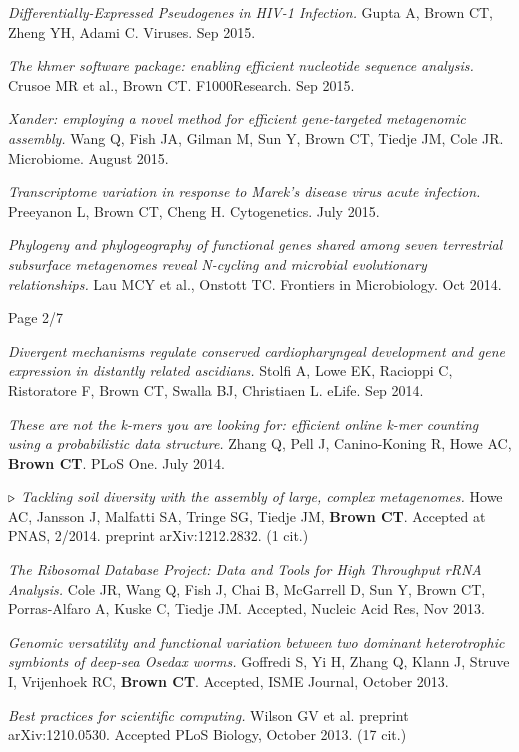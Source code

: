 \documentclass[margin,line]{resume}
\begin{document}
\begin{resume}
{\em Differentially-Expressed Pseudogenes in HIV-1 Infection.} Gupta A, Brown CT, Zheng YH, Adami C. Viruses. Sep 2015.

{\em The khmer software package: enabling efficient nucleotide sequence analysis.} Crusoe MR et al., Brown CT. F1000Research. Sep 2015.

{\em Xander: employing a novel method for efficient gene-targeted metagenomic assembly.} Wang Q, Fish JA, Gilman M, Sun Y, Brown CT, Tiedje JM, Cole JR. Microbiome. August 2015.

{\em Transcriptome variation in response to Marek’s disease virus acute infection.} Preeyanon L, Brown CT, Cheng H. Cytogenetics. July 2015.

{\em Phylogeny and phylogeography of functional genes shared among seven terrestrial subsurface metagenomes reveal N-cycling and microbial evolutionary relationships.} Lau MCY et al., Onstott TC. Frontiers in Microbiology. Oct 2014.

\vspace{1cm}
{\centerline {Page 2/7}}

\newpage

{\em Divergent mechanisms regulate conserved cardiopharyngeal development and gene expression in distantly related ascidians.} Stolfi A, Lowe EK, Racioppi C, Ristoratore F, Brown CT, Swalla BJ, Christiaen L. eLife. Sep 2014.

{\em These are not the k-mers you are looking for: efficient online
  k-mer counting using a probabilistic data structure.} Zhang Q, Pell
J, Canino-Koning R, Howe AC, {\bf Brown CT}.  PLoS One. July 2014.

{\color{red} ${\bf \triangleright}$}
{\em Tackling soil diversity with the assembly of large, complex metagenomes.}
Howe AC, Jansson J, Malfatti SA, Tringe SG, Tiedje JM, {\bf Brown CT}. Accepted at PNAS, 2/2014.  preprint arXiv:1212.2832. (1 cit.)

{\em The Ribosomal Database Project: Data and Tools for High Throughput rRNA Analysis.} Cole JR, Wang Q, Fish J, Chai B, McGarrell D, Sun Y, Brown CT, Porras-Alfaro A, Kuske C, Tiedje JM.  Accepted, Nucleic Acid Res, Nov 2013.

{\em Genomic versatility and functional variation between two dominant
heterotrophic symbionts of deep-sea {\rm Osedax} worms.} Goffredi S, Yi H, Zhang Q, Klann J, Struve I, Vrijenhoek RC, {\bf Brown CT}. Accepted, ISME Journal, October 2013.

{\em Best practices for scientific computing.} Wilson GV et al. preprint arXiv:1210.0530. Accepted PLoS Biology, October 2013. (17 cit.)


\end{resume}
\end{document}
